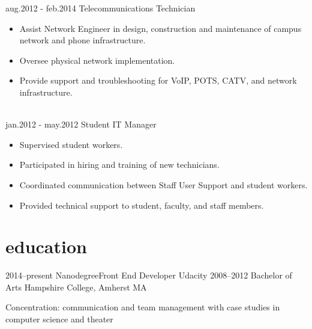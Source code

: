 \documentclass[]{friggeri-cv} %
\begin{document}
\begin{entrylist}
\entry
{aug.2012 - feb.2014}
{Telecommunications Technician}{}
{\begin{itemize}[leftmargin=*,topsep=0pt]
\item Assist Network Engineer in design, construction and maintenance of campus network and phone infrastructure.
\item Oversee physical network implementation.
\item Provide support and troubleshooting for VoIP, POTS, CATV, and network infrastructure.
\end{itemize}}
\\
\entry
{jan.2012 - may.2012}
{Student IT Manager}{}
{\begin{itemize}[leftmargin=*,topsep=0pt]
\item Supervised student workers.
\item Participated in hiring and training of new technicians.
\item Coordinated communication between Staff User Support and student workers.
\item Provided technical support to student, faculty, and staff members.
\end{itemize}}
\end{entrylist}


\section{education}

\begin{entrylist}
\entry
{2014--present}
{Nanodegree}{Front End Developer}
{Udacity}
\entry
{2008--2012}
{Bachelor of Arts}{}
{Hampshire College, Amherst MA}

\entry
{\mediumitalic Concentration:}
{\normalfont communication and team management with case studies in computer science and theater}{}{}
\end{entrylist}
\end{document}
